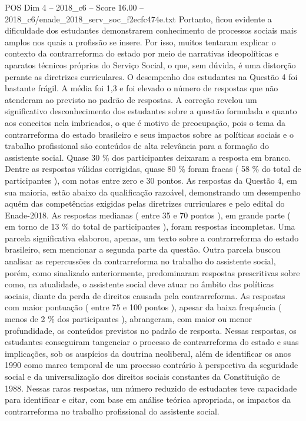 \begin{textsample}{POS Dim 4 – 2018\_c6 – Score 16.00 – 2018\_c6/enade\_2018\_serv\_soc\_f2ecfc474e.txt}
Portanto, ficou evidente a dificuldade dos estudantes demonstrarem conhecimento de processos sociais mais amplos nos quais a profissão se insere.
Por isso, muitos tentaram explicar o contexto da contrarreforma do estado por meio de narrativas ideopolíticas e aparatos técnicos próprios do Serviço Social, o que, sem dúvida, é uma distorção perante as diretrizes curriculares.
O desempenho dos estudantes na Questão 4 foi bastante frágil.
A média foi 1,3 e foi elevado o número de respostas que não atenderam ao previsto no padrão de respostas.
A correção revelou um significativo desconhecimento dos estudantes sobre a questão formulada e quanto aos conceitos nela imbricados, o que é motivo de preocupação, pois o tema da contrarreforma do estado brasileiro e seus impactos sobre as políticas sociais e o trabalho profissional são conteúdos de alta relevância para a formação do assistente social.
Quase 30 \% dos participantes deixaram a resposta em branco.
Dentre as respostas válidas corrigidas, quase 80 \% foram fracas ( 58 \% do total de participantes ), com notas entre zero e 30 pontos.
As respostas da Questão 4, em sua maioria, estão abaixo da qualificação razoável, demonstrando um desempenho aquém das competências exigidas pelas diretrizes curriculares e pelo edital do Enade-2018.
As respostas medianas ( entre 35 e 70 pontos ), em grande parte ( em torno de 13 \% do total de participantes ), foram respostas incompletas.
Uma parcela significativa elaborou, apenas, um texto sobre a contrarreforma do estado brasileiro, sem mencionar a segunda parte da questão.
Outra parcela buscou analisar as repercussões da contrarreforma no trabalho do assistente social, porém, como sinalizado anteriormente, predominaram respostas prescritivas sobre como, na atualidade, o assistente social deve atuar no âmbito das políticas sociais, diante da perda de direitos causada pela contrarreforma.
As respostas com maior pontuação ( entre 75 e 100 pontos ), apesar da baixa frequência ( menos de 2 \% dos participantes ), abrangeram, com maior ou menor profundidade, os conteúdos previstos no padrão de resposta.
Nessas respostas, os estudantes conseguiram tangenciar o processo de contrarreforma do estado e suas implicações, sob os auspícios da doutrina neoliberal, além de identificar os anos 1990 como marco temporal de um processo contrário à perspectiva da seguridade social e da universalização dos direitos sociais constantes da Constituição de 1988.
Nessas raras respostas, um número reduzido de estudantes teve capacidade para identificar e citar, com base em análise teórica apropriada, os impactos da contrarreforma no trabalho profissional do assistente social.

\end{textsample}
